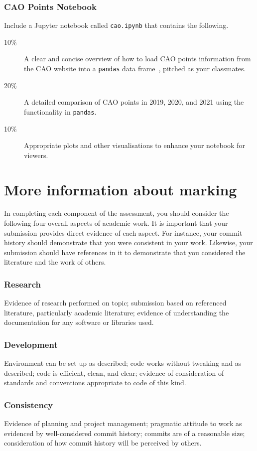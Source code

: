 \documentclass[a4paper, 12pt]{scrartcl}
\begin{document}
  \subsubsection*{CAO Points Notebook}
  Include a Jupyter notebook called \texttt{cao.ipynb} that contains the following.
  \begin{description}
    \item[10\%] A clear and concise overview of how to load CAO points information from the CAO website into a \texttt{pandas} data frame~\cite{pandas}, pitched as your classmates.
    \item[20\%] A detailed comparison of CAO points in 2019, 2020, and 2021 using the functionality in \texttt{pandas}.
    \item[10\%] Appropriate plots and other visualisations to enhance your notebook for viewers.
  \end{description}

  \section*{More information about marking}
    In completing each component of the assessment, you should consider the following four overall aspects of academic work.
    It is important that your submission provides direct evidence of each aspect.
    For instance, your commit history should demonstrate that you were consistent in your work.
    Likewise, your submission should have references in it to demonstrate that you considered the literature and the work of others.
  
    \subsubsection*{Research}
    Evidence of research performed on topic; submission based on referenced literature, particularly academic literature; evidence of understanding the documentation for any software or libraries used.
    \subsubsection*{Development}
    Environment can be set up as described; code works without tweaking and as described; code is efficient, clean, and clear; evidence of consideration of standards and conventions appropriate to code of this kind.
    \subsubsection*{Consistency}
    Evidence of planning and project management; pragmatic attitude to work as evidenced by well-considered commit history; commits are of a reasonable size; consideration of how commit history will be perceived by others.
\end{document}
